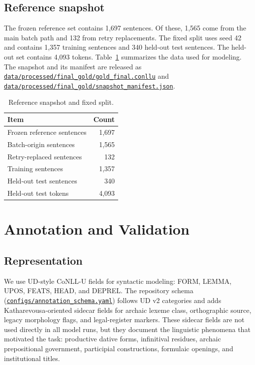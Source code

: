 \documentclass[11pt]{article}
\newcommand{\repobase}{https://github.com/gmikros/katharevousa-nlp-tooling}
\newcommand{\repofile}[1]{\href{\repobase/blob/main/#1}{\nolinkurl{#1}}}
\begin{document}
\subsection{Reference snapshot}

The frozen reference set contains 1{,}697 sentences. Of these, 1{,}565 come from the main batch path and 132 from retry replacements. The fixed split uses seed 42 and contains 1{,}357 training sentences and 340 held-out test sentences. The held-out set contains 4{,}093 tokens. Table~\ref{tab:data} summarizes the data used for modeling. The snapshot and its manifest are released as \repofile{data/processed/final_gold/gold_final.conllu} and \repofile{data/processed/final_gold/snapshot_manifest.json}.

\begin{table}[H]
\centering
\caption{Reference snapshot and fixed split.}
\label{tab:data}
\begin{tabular}{lr}
\toprule
Item & Count \\
\midrule
Frozen reference sentences & 1{,}697 \\
Batch-origin sentences & 1{,}565 \\
Retry-replaced sentences & 132 \\
Training sentences & 1{,}357 \\
Held-out test sentences & 340 \\
Held-out test tokens & 4{,}093 \\
\bottomrule
\end{tabular}
\end{table}

\section{Annotation and Validation}

\subsection{Representation}

We use UD-style CoNLL-U fields for syntactic modeling: FORM, LEMMA, UPOS, FEATS, HEAD, and DEPREL. The repository schema (\repofile{configs/annotation_schema.yaml}) follows UD v2 categories and adds Katharevousa-oriented sidecar fields for archaic lexeme class, orthographic source, legacy morphology flags, and legal-register markers. These sidecar fields are not used directly in all model runs, but they document the linguistic phenomena that motivated the task: productive dative forms, infinitival residues, archaic prepositional government, participial constructions, formulaic openings, and institutional titles.
\end{document}

